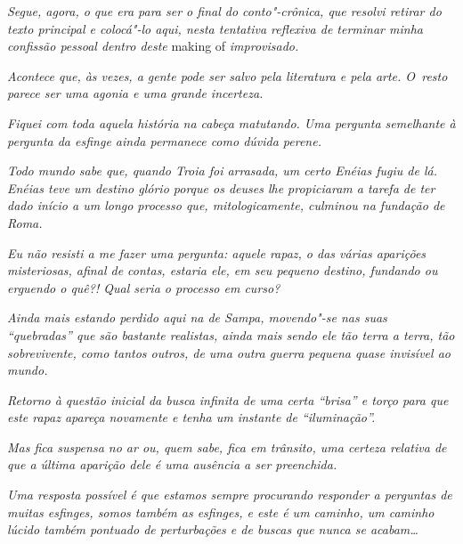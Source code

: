 \emph{\asterisc{}}

\emph{Segue, agora, o que era para ser o final do conto"-crônica, que
resolvi retirar do texto principal e colocá"-lo aqui, nesta tentativa
reflexiva de terminar minha confissão pessoal dentro deste} making of
\emph{improvisado.}~

\emph{Acontece que, às vezes, a gente pode ser salvo pela literatura e
pela arte. O~resto parece ser uma agonia e uma grande incerteza.}~

\emph{Fiquei com toda aquela história na cabeça matutando. Uma pergunta
semelhante à pergunta da esfinge ainda permanece como dúvida perene.}~

\emph{Todo mundo sabe que, quando Troia foi arrasada, um certo Enéias
fugiu de lá. Enéias teve um destino glório porque os deuses lhe
propiciaram a tarefa de ter dado início a um longo processo que,
mitologicamente, culminou na fundação de Roma.}~

\emph{Eu não resisti a me fazer uma pergunta: aquele rapaz, o das várias
aparições misteriosas, afinal de contas, estaria ele, em seu pequeno
destino, fundando ou erguendo o quê?! Qual seria o processo em curso?}~

\emph{Ainda mais estando perdido aqui na  de Sampa, movendo"-se nas
suas ``quebradas'' que são bastante realistas, ainda mais sendo ele tão
terra a terra, tão sobrevivente, como tantos outros, de uma outra guerra
pequena quase invisível ao mundo.}~

\emph{Retorno à questão inicial da busca infinita de uma certa ``brisa''
e torço para que este rapaz apareça novamente e tenha um instante de
``iluminação''.}~

\emph{Mas fica suspensa no ar ou, quem sabe, fica em trânsito, uma
certeza relativa de que a última aparição dele é uma ausência a ser
preenchida.}

\emph{Uma resposta possível é que estamos sempre procurando responder a
perguntas de muitas esfinges, somos também as esfinges, e este é um
caminho, um caminho lúcido também pontuado de perturbações e de buscas
que nunca se acabam…~}
\endgroup